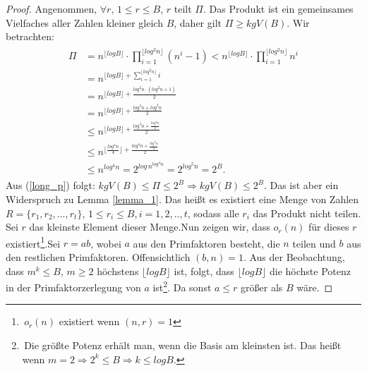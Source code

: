 \documentclass[12pt,oneside]{article}
\theoremstyle{remark}
\theoremstyle{definition}
\begin{document}
\begin{proof}
Angenommen, $\forall r, \, 1 \leq r \leq B$, $r$ teilt $\Pi$. Das Produkt ist ein gemeinsames Vielfaches aller Zahlen kleiner gleich $B$, daher gilt $\Pi \geq kgV(B)$.\newline
Wir betrachten:
\begin{equation}\label{long_p}
    \begin{split}
        \begin{aligned}
            \Pi &= n^{\lfloor log B \rfloor } \cdot \prod_{i = 1}^{\lfloor log^2 n \rfloor} (n^i - 1)
                < n^{\lfloor log B \rfloor } \cdot \prod_{i = 1}^{\lfloor log^2 n \rfloor} n^i \\
                &= n^{\lfloor log B \rfloor + \sum_{i = 1}^{\lfloor log^2 n \rfloor } i}\\ 
                &= n^{\lfloor log B \rfloor + \frac{log^2 n \cdot (log^2 n + 1)}{2}} \\
                &= n^{\lfloor log B \rfloor + \frac{log^4 n + log^2 n}{2}}\\
                & \leq n^{\lfloor log B \rfloor + \frac{log^4 n + \frac{log^4 n}{2}}{2}}\\
                & \leq n^{\lfloor \frac{log^4 n}{4} \rfloor + \frac{log^4 n + \frac{log^4 n}{2}}{2}}\\
                &\leq n^{log^4 n} = 2^{log \, n^{log^4 n}} = 2^{log^5 n} = 2^{B}.
        \end{aligned}
    \end{split}
\end{equation}
Aus (\ref{long_p}) folgt: $kgV(B) \leq \Pi \leq 2^B \Rightarrow kgV(B) \leq 2^B$. Das ist aber ein Widerspruch zu Lemma \ref{lemma_1}. Das heißt es existiert eine Menge von Zahlen $R = \{r_{1},r_{2},...,r_{t}\}$, $ 1 \leq r_i \leq B$,$\, i = 1,2, ..,t$, sodass alle $r_{i}$ das Produkt nicht teilen. Sei $r$ das kleinste Element dieser Menge.\newline\newline Nun zeigen wir, dass $o_{r}(n)$ für dieses $r$ existiert\footnote{$ \, o_{r}(n)$ existiert wenn $(n,r) = 1$}.\newline\newline Sei $r = ab $, wobei $a$ aus den Primfaktoren besteht, die $n$ teilen und $b$ aus den restlichen Primfaktoren. Offensichtlich $(b,n) = 1$. Aus der Beobachtung, dass $m^k \leq B, \, m \geq 2$ höchstens $\lfloor log B \rfloor$ ist, folgt, dass $ \lfloor log B \rfloor$  die höchste Potenz in der Primfaktorzerlegung von $a$ ist\footnote{ $ \,$Die größte Potenz erhält man, wenn die Basis am kleinsten ist. Das heißt wenn $m = 2 \Rightarrow 2^k \leq B \Rightarrow k \leq log B $.}. Da sonst $a \leq r$ größer als $B$ wäre.\newline\newline

\end{proof}
\end{document}

